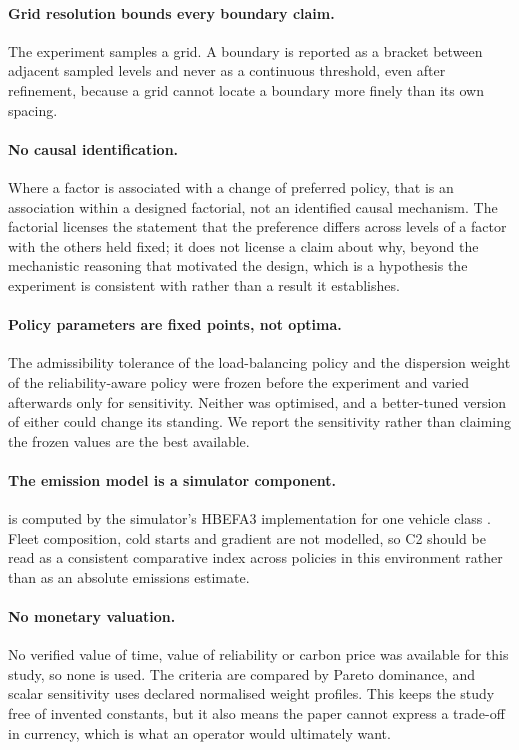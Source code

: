 \paragraph{Grid resolution bounds every boundary claim.} The experiment samples
a grid. A boundary is reported as a bracket between adjacent sampled levels and
never as a continuous threshold, even after refinement, because a grid cannot
locate a boundary more finely than its own spacing.

\paragraph{No causal identification.} Where a factor is associated with a change
of preferred policy, that is an association within a designed factorial, not an
identified causal mechanism. The factorial licenses the statement that the
preference differs across levels of a factor with the others held fixed; it does
not license a claim about why, beyond the mechanistic reasoning that motivated
the design, which is a hypothesis the experiment is consistent with rather than
a result it establishes.

\paragraph{Policy parameters are fixed points, not optima.} The admissibility
tolerance of the load-balancing policy and the dispersion weight of the
reliability-aware policy were frozen before the experiment and varied afterwards
only for sensitivity. Neither was optimised, and a better-tuned version of
either could change its standing. We report the sensitivity rather than claiming
the frozen values are the best available.

\paragraph{The emission model is a simulator component.} \CO{} is computed by
the simulator's HBEFA3 implementation for one vehicle class
\cite{krajzewicz2015emissions}. Fleet composition, cold starts and gradient are
not modelled, so C2 should be read as a consistent comparative index across
policies in this environment rather than as an absolute emissions estimate.

\paragraph{No monetary valuation.} No verified value of time, value of
reliability or carbon price was available for this study, so none is used. The
criteria are compared by Pareto dominance, and scalar sensitivity uses declared
normalised weight profiles. This keeps the study free of invented constants, but
it also means the paper cannot express a trade-off in currency, which is what an
operator would ultimately want.
